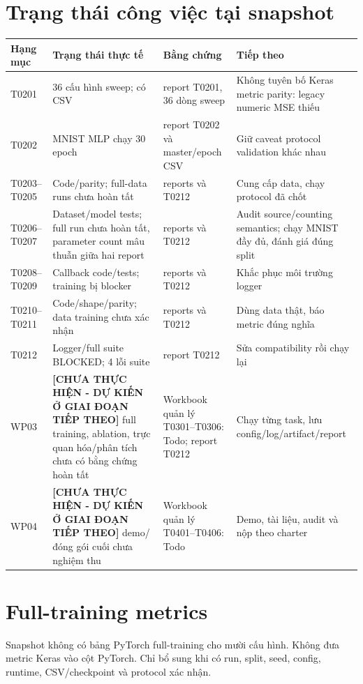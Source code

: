 \section{Trạng thái công việc tại snapshot}
\begin{longtable}{p{}p{}p{}p{}}
\toprule Hạng mục & Trạng thái thực tế & Bằng chứng & Tiếp theo \\
\midrule
T0201 & 36 cấu hình sweep; có CSV & report T0201, 36 dòng sweep & Không tuyên bố Keras metric parity: legacy numeric MSE thiếu \\
T0202 & MNIST MLP chạy 30 epoch & report T0202 và master/epoch CSV & Giữ caveat protocol validation khác nhau \\
T0203--T0205 & Code/parity; full-data runs chưa hoàn tất & reports và T0212 & Cung cấp data, chạy protocol đã chốt \\
T0206--T0207 & Dataset/model tests; full run chưa hoàn tất, parameter count mâu thuẫn giữa hai report & reports và T0212 & Audit source/counting semantics; chạy MNIST đầy đủ, đánh giá đúng split \\
T0208--T0209 & Callback code/tests; training bị blocker & reports và T0212 & Khắc phục môi trường logger \\
T0210--T0211 & Code/shape/parity; data training chưa xác nhận & reports và T0212 & Dùng data thật, báo metric đúng nghĩa \\
T0212 & Logger/full suite BLOCKED; 4 lỗi suite & report T0212 & Sửa compatibility rồi chạy lại \\
WP03 & \textbf{[CHƯA THỰC HIỆN - DỰ KIẾN Ở GIAI ĐOẠN TIẾP THEO]} full training, ablation, trực quan hóa/phân tích chưa có bằng chứng hoàn tất & Workbook quản lý T0301--T0306: Todo; report T0212 & Chạy từng task, lưu config/log/artifact/report \\
WP04 & \textbf{[CHƯA THỰC HIỆN - DỰ KIẾN Ở GIAI ĐOẠN TIẾP THEO]} demo/đóng gói cuối chưa nghiệm thu & Workbook quản lý T0401--T0406: Todo & Demo, tài liệu, audit và nộp theo charter \\
\bottomrule
\end{longtable}

\section{Full-training metrics}
Snapshot không có bảng PyTorch full-training cho mười cấu hình. Không đưa metric Keras vào cột PyTorch. Chỉ bổ sung khi có run, split, seed, config, runtime, CSV/checkpoint và protocol xác nhận.

